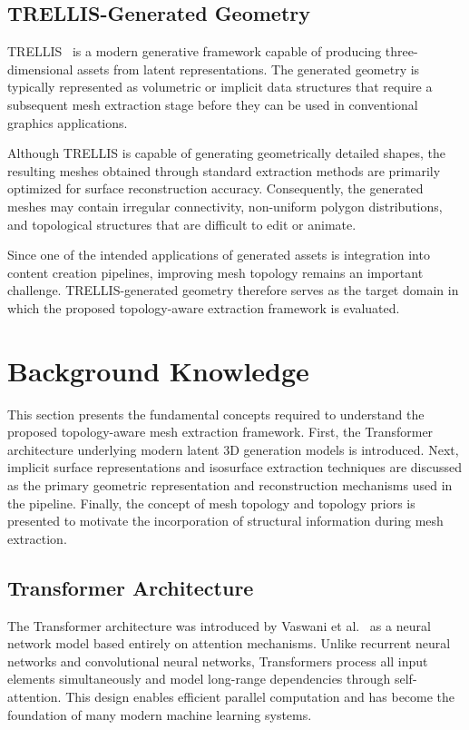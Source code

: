 \documentclass[../main.tex]{subfiles}
\begin{document}
\subsection{TRELLIS-Generated Geometry}

TRELLIS~\cite{xiang2024structured} is a modern generative framework capable of producing three-dimensional assets from latent representations. The generated geometry is typically represented as volumetric or implicit data structures that require a subsequent mesh extraction stage before they can be used in conventional graphics applications.

Although TRELLIS is capable of generating geometrically detailed shapes, the resulting meshes obtained through standard extraction methods are primarily optimized for surface reconstruction accuracy. Consequently, the generated meshes may contain irregular connectivity, non-uniform polygon distributions, and topological structures that are difficult to edit or animate.

Since one of the intended applications of generated assets is integration into content creation pipelines, improving mesh topology remains an important challenge. TRELLIS-generated geometry therefore serves as the target domain in which the proposed topology-aware extraction framework is evaluated.

\section{Background Knowledge}

This section presents the fundamental concepts required to understand the proposed topology-aware mesh extraction framework. First, the Transformer architecture underlying modern latent 3D generation models is introduced. Next, implicit surface representations and isosurface extraction techniques are discussed as the primary geometric representation and reconstruction mechanisms used in the pipeline. Finally, the concept of mesh topology and topology priors is presented to motivate the incorporation of structural information during mesh extraction.

\subsection{Transformer Architecture}

The Transformer architecture was introduced by Vaswani et al.~\cite{vaswani2017attention} as a neural network model based entirely on attention mechanisms. Unlike recurrent neural networks and convolutional neural networks, Transformers process all input elements simultaneously and model long-range dependencies through self-attention. This design enables efficient parallel computation and has become the foundation of many modern machine learning systems.
\end{document}
